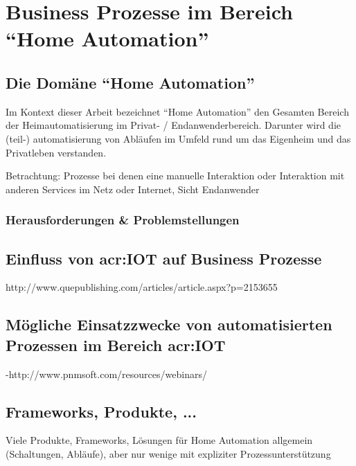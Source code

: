 
\chapter{Business Prozesse im Bereich "`Home Automation"'}


\section{Die Domäne "`Home Automation"'}
Im Kontext dieser Arbeit bezeichnet "`Home Automation"' den Gesamten Bereich der Heimautomatisierung im Privat- / Endanwenderbereich. Darunter wird die (teil-) automatisierung von Abläufen im Umfeld rund um das Eigenheim und das Privatleben verstanden.



Betrachtung: Prozesse bei denen eine manuelle Interaktion oder Interaktion mit anderen Services im Netz oder Internet, Sicht Endanwender


\subsection{Herausforderungen \& Problemstellungen}



\section{Einfluss von \gls{acr:IOT} auf Business Prozesse}

http://www.quepublishing.com/articles/article.aspx?p=2153655

\section{Mögliche Einsatzzwecke von automatisierten Prozessen im Bereich \gls{acr:IOT}}

-http://www.pnmsoft.com/resources/webinars/

\section{Frameworks, Produkte, ...}
Viele Produkte, Frameworks, Lösungen für Home Automation allgemein (Schaltungen, Abläufe), aber nur wenige mit expliziter Prozessunterstützung


